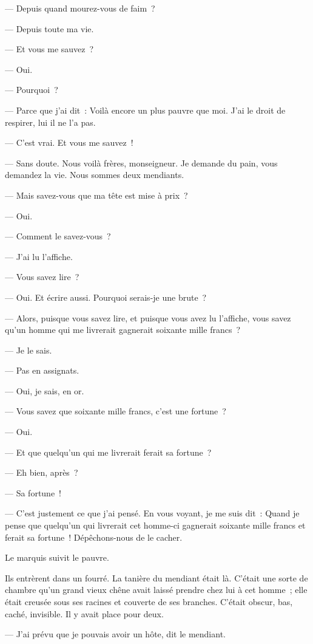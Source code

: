 \documentclass[french,twoside]{book} %
\begin{document}
— Depuis quand mourez-vous de faim ?\par
— Depuis toute ma vie.\par
— Et vous me sauvez ?\par
 — Oui.\par
— Pourquoi ?\par
— Parce que j’ai dit : Voilà encore un plus pauvre que moi. J’ai le droit de respirer, lui il ne l’a pas.\par
— C’est vrai. Et vous me sauvez !\par
— Sans doute. Nous voilà frères, monseigneur. Je demande du pain, vous demandez la vie. Nous sommes deux mendiants.\par
— Mais savez-vous que ma tête est mise à prix ?\par
— Oui.\par
— Comment le savez-vous ?\par
— J’ai lu l’affiche.\par
— Vous savez lire ?\par
— Oui. Et écrire aussi. Pourquoi serais-je une brute ?\par
— Alors, puisque vous savez lire, et puisque vous avez lu l’affiche, vous savez qu’un homme qui me livrerait gagnerait soixante mille francs ?\par
— Je le sais.\par
— Pas en assignats.\par
— Oui, je sais, en or.\par
— Vous savez que soixante mille francs, c’est une fortune ?\par
— Oui.\par
— Et que quelqu’un qui me livrerait ferait sa fortune ?\par
— Eh bien, après ?\par
— Sa fortune !\par
— C’est justement ce que j’ai pensé. En vous voyant, je me suis dit : Quand je pense que quelqu’un  qui livrerait cet homme-ci gagnerait soixante mille francs et ferait sa fortune ! Dépêchons-nous de le cacher.\par
Le marquis suivit le pauvre.\par
Ils entrèrent dans un fourré. La tanière du mendiant était là. C’était une sorte de chambre qu’un grand vieux chêne avait laissé prendre chez lui à cet homme ; elle était creusée sous ses racines et couverte de ses branches. C’était obscur, bas, caché, invisible. Il y avait place pour deux.\par
— J’ai prévu que je pouvais avoir un hôte, dit le mendiant.\par
\end{document}
